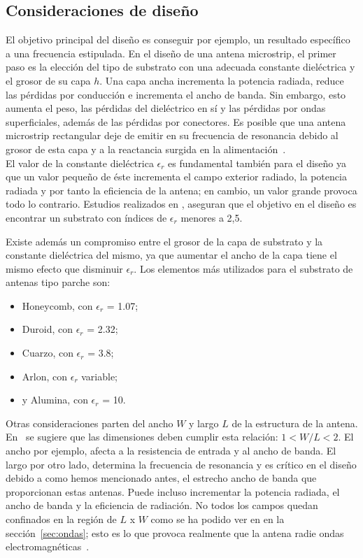\subsection{Consideraciones de diseño}\label{subsec:consideraciones-de-diseno}

El objetivo principal del diseño es conseguir por ejemplo, un resultado específico a una frecuencia estipulada. En el diseño de una antena microstrip, el primer paso es la elección del tipo de substrato con una adecuada constante dieléctrica y el grosor de su capa $h$. Una capa ancha incrementa la potencia radiada, reduce las pérdidas por conducción e incrementa el ancho de banda. Sin embargo, esto aumenta el peso, las pérdidas del dieléctrico en sí y las pérdidas por ondas superficiales, además de las pérdidas por conectores. Es posible que una antena microstrip rectangular deje de emitir en su frecuencia de resonancia debido al grosor de esta capa y a la reactancia surgida en la alimentación~\cite{pozar}.\\

El valor de la constante dieléctrica $\epsilon_{r}$ es fundamental también para el diseño ya que un valor pequeño de éste incrementa el campo exterior radiado, la potencia radiada y por tanto la eficiencia de la antena; en cambio, un valor grande provoca todo lo contrario. Estudios realizados en \cite{garg4}, aseguran que el objetivo en el diseño es encontrar un substrato con índices de $\epsilon_{r}$ menores a 2,5.

Existe además un compromiso entre el grosor de la capa de substrato y la constante dieléctrica del mismo, ya que aumentar el ancho de la capa tiene el mismo efecto que disminuir $\epsilon_{r}$. Los elementos más utilizados para el substrato de antenas tipo parche son:

\begin{itemize}
    \item Honeycomb, con $\epsilon_{r}$ = 1.07;
    \item Duroid, con $\epsilon_{r}$ = 2.32;
    \item Cuarzo, con $\epsilon_{r}$ = 3.8;
    \item Arlon, con $\epsilon_{r}$ variable;
    \item y Alumina, con $\epsilon_{r}$ = 10.
\end{itemize}

Otras consideraciones parten del ancho $W$ y largo $L$ de la estructura de la antena. En~\cite{garg4} se sugiere que las dimensiones deben cumplir esta relación: $1 < W/L <2$. El ancho por ejemplo, afecta a la resistencia de entrada y al ancho de banda. El largo por otro lado, determina la frecuencia de resonancia y es crítico en el diseño debido a como hemos mencionado antes, el estrecho ancho de banda que proporcionan estas antenas. Puede incluso incrementar la potencia radiada, el ancho de banda y la eficiencia de radiación. No todos los campos quedan confinados en la región de $L$ x $W$ como se ha podido ver en en la sección~\ref{sec:ondas}; esto es lo que provoca realmente que la antena radie ondas electromagnéticas~\cite{garg4}.

